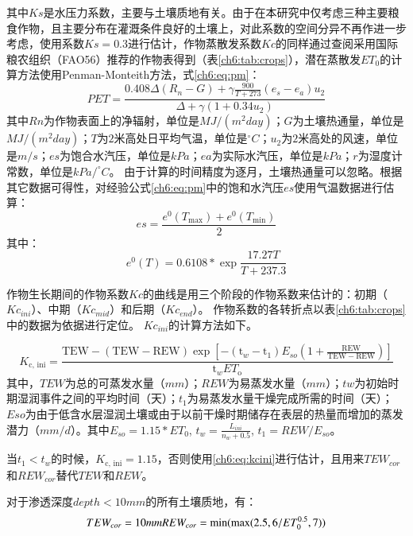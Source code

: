 其中$Ks$是水压力系数，主要与土壤质地有关。由于在本研究中仅考虑三种主要粮食作物，且主要分布在灌溉条件良好的土壤上，对此系数的空间分异不再作进一步考虑，使用系数$Ks = 0.3$进行估计，作物蒸散发系数$Kc$的同样通过查阅采用国际粮农组织（FAO56）推荐的作物表得到（表\ref{ch6:tab:crops}）\cite{chen2023}，潜在蒸散发$ET_0$的计算方法使用Penman-Monteith方法，式\ref{ch6:eq:pm}：
\begin{equation}
    \label{ch6:eq:pm}
    PET = \frac{0.408 \Delta (R_{n}-G)+\gamma \frac{900}{T+273}
    (e_s-e_a) u_2}{\Delta+\gamma(1+0.34 u_2)}
\end{equation}
其中$Rn$为作物表面上的净辐射，单位是$MJ/(m^2 day)$；$G$为土壤热通量，单位是$MJ/(m^2 day)$；$T$为$2$米高处日平均气温，单位是$^\circ C$；$u_2$为$2$米高处的风速，单位是$m/s$；$es$为饱合水汽压，单位是$kPa$；$ea$为实际水汽压，单位是$kPa$；$r$为湿度计常数，单位是$kPa/^\circ C$。
由于计算的时间精度为逐月，土壤热通量可以忽略。根据其它数据可得性，对经验公式\ref{ch6:eq:pm}中的饱和水汽压$es$使用气温数据进行估算：
\begin{equation}
    es = \frac{e^0(T_{\max}) + e^0(T_{\min})}{2}
\end{equation}
其中：
\begin{equation}
    e^0(T) = 0.6108 * \exp \frac{17.27 T}{T + 237.3}
\end{equation}

作物生长期间的作物系数$Kc$的曲线是用三个阶段的作物系数来估计的：初期（$Kc_{ini}$）、中期（$Kc_{mid}$）和后期（$Kc_{end}$）。
作物系数的各转折点以表\ref{ch6:tab:crops}中的数据为依据进行定位。
$Kc_{ini}$的计算方法如下\cite{allen1998}。

\begin{equation}
    \label{ch6:eq:kcini}
    K_{\text {c, ini}}=\frac{\mathrm{TEW}-(\mathrm{TEW}-\mathrm{REW}) \exp \left[-\left(\mathrm{t}_w-\mathrm{t}_1\right) E_{so}\left(1+\frac{\mathrm{REW}}{\mathrm{TEW}-\mathrm{REW}}\right)\right]}{\mathrm{t}_w E T_{\mathrm{o}}}
\end{equation}
其中，$TEW$为总的可蒸发水量（$mm$）；$REW$为易蒸发水量（$mm$）；$tw$为初始时期湿润事件之间的平均时间（天）；$t_1$为易蒸发水量干燥完成所需的时间（天）；$Eso$为由于低含水层湿润土壤或由于以前干燥时期储存在表层的热量而增加的蒸发潜力（$mm/d$）。其中$E_{so} = 1.15 * ET_0$, $t_w = \frac{L_{ini}}{n_w + 0.5}$, $t_1 = REW / E_{so}$。

当$t_1 < t_w$的时候，$K_{\text {c, ini}} = 1.15$，否则使用\ref{ch6:eq:kcini}进行估计，且用来$TEW_{cor}$和$REW_{cor}$替代$TEW$和$REW$。

对于渗透深度$depth < 10mm$的所有土壤质地，有：
\begin{equation}
    TEW_{cor} = 10mm \\
    REW_{cor} = \min(\max(2.5, 6 / ET_0^{0.5}, 7))
\end{equation}

